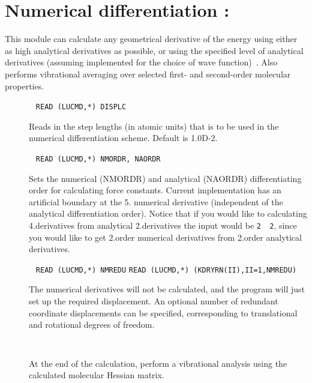 \section{Numerical differentiation : }\label{sec:nmddrv}

This module can calculate any geometrical derivative of the energy
using either as high analytical derivatives as possible, or using the
specified level of analytical derivatives (assuming implemented for
the choice of wave function)~\cite{numder}. Also performs vibrational averaging over
selected first- and second-order molecular properties.

\begin{description}

\item[]\verb| |\newline
\verb|READ (LUCMD,*) DISPLC|

Reads in the step lengths (in atomic units) that is to be used in the
numerical differentiation scheme. Default is 1.0D-2.

\item[]\verb| |\newline
\verb|READ (LUCMD,*) NMORDR, NAORDR|

Sets the numerical (NMORDR) and analytical (NAORDR) differentiating
order for calculating force constants. Current implementation has an
artificial boundary at the 5. numerical derivative (independent of the
analytical differentiation order). Notice that if you would like to
calculating 4.derivatives from analytical 2.derivatives the input
would be \verb|2  2|, since you would like to get 2.order numerical
derivatives from 2.order analytical derivatives.

\item[]\verb| |\newline
\verb|READ (LUCMD,*) NMREDU|\newline
\verb|READ (LUCMD,*) (KDRYRN(II),II=1,NMREDU)|

The numerical derivatives will not be calculated, and the program will
just set up the required displacement. An optional number of redundant
coordinate displacements can be specified, corresponding to translational and
rotational degrees of freedom.

\item[]\verb| |\newline

At the end of the calculation, perform a vibrational analysis using
the calculated molecular Hessian matrix.


\end{description}
